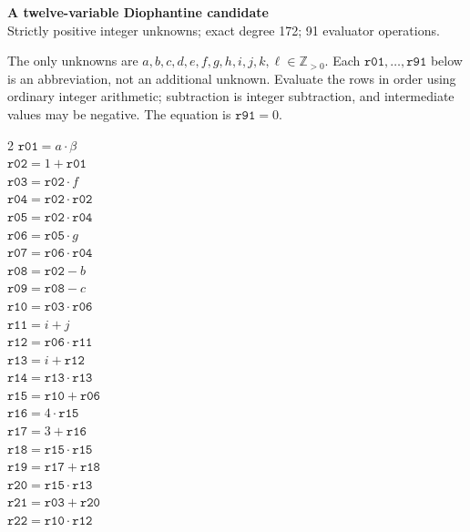 \documentclass[10pt]{article}
\begin{document}
\begin{center}
{\large\bfseries A twelve-variable Diophantine candidate}\\
{\small Strictly positive integer unknowns; exact degree 172; 91 evaluator operations.}
\end{center}
The only unknowns are \(a,b,c,d,e,f,g,h,i,j,k,\ell\in\mathbb Z_{>0}\).
Each \(\mathtt{r01},\ldots,\mathtt{r91}\) below is an abbreviation,
not an additional unknown. Evaluate the rows in order using ordinary integer
arithmetic; subtraction is integer subtraction, and intermediate values may be
negative. The equation is
\(\boxed{\mathtt{r91}=0}\).

\begin{multicols}{2}\small
\(\mathtt{r01} = a \cdot \beta\)\\
\(\mathtt{r02} = 1 + \mathtt{r01}\)\\
\(\mathtt{r03} = \mathtt{r02} \cdot f\)\\
\(\mathtt{r04} = \mathtt{r02} \cdot \mathtt{r02}\)\\
\(\mathtt{r05} = \mathtt{r02} \cdot \mathtt{r04}\)\\
\(\mathtt{r06} = \mathtt{r05} \cdot g\)\\
\(\mathtt{r07} = \mathtt{r06} \cdot \mathtt{r04}\)\\
\(\mathtt{r08} = \mathtt{r02} - b\)\\
\(\mathtt{r09} = \mathtt{r08} - c\)\\
\(\mathtt{r10} = \mathtt{r03} \cdot \mathtt{r06}\)\\
\(\mathtt{r11} = i + j\)\\
\(\mathtt{r12} = \mathtt{r06} \cdot \mathtt{r11}\)\\
\(\mathtt{r13} = i + \mathtt{r12}\)\\
\(\mathtt{r14} = \mathtt{r13} \cdot \mathtt{r13}\)\\
\(\mathtt{r15} = \mathtt{r10} + \mathtt{r06}\)\\
\(\mathtt{r16} = 4 \cdot \mathtt{r15}\)\\
\(\mathtt{r17} = 3 + \mathtt{r16}\)\\
\(\mathtt{r18} = \mathtt{r15} \cdot \mathtt{r15}\)\\
\(\mathtt{r19} = \mathtt{r17} + \mathtt{r18}\)\\
\(\mathtt{r20} = \mathtt{r15} \cdot \mathtt{r13}\)\\
\(\mathtt{r21} = \mathtt{r03} + \mathtt{r20}\)\\
\(\mathtt{r22} = \mathtt{r10} \cdot \mathtt{r12}\)\\

\end{multicols}
\end{document}
